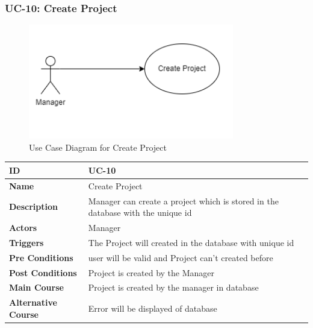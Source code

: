     \subsubsection{UC-10: Create Project}
    \begin{figure}[H]
        \includegraphics[height=5cm, width=0.8\textwidth]{./diagrams/Use Case/u10.png}
        \centering 
        \caption{Use Case Diagram for Create Project}
        \label{fig:Usecase1}
        \end{figure}
        
    \begin{center}
        \begin{tabularx}{\textwidth}{|l|X|}
            \hline
            \textbf{ID} & UC-10 \\
            \hline
            \textbf{Name} & Create Project \\
            \hline
            \textbf{Description} & Manager can create a project which is stored in the database with the unique id \\
            \hline
            \textbf{Actors} & Manager \\
            \hline
            \textbf{Triggers} & The Project will created in the database with unique id \\
            \hline
            \textbf{Pre Conditions} & user will be valid and Project can't created before  \\
            \hline
            \textbf{Post Conditions} & Project is created by the Manager \\
            \hline
            \textbf{Main Course} & Project is created by the manager in database \\
            \hline
            \textbf{Alternative Course} & Error will be displayed of database  \\
            \hline
            
        \end{tabularx}
    \end{center}
    
